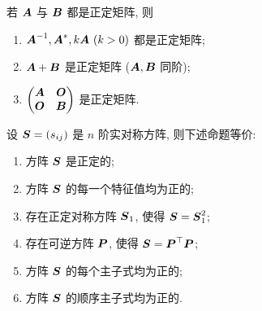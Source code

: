 
\begin{theorem}
    若 $\vb*{A}$ 与 $\vb*{B}$ 都是正定矩阵, 则 
    \begin{enumerate}[label=(\arabic{*})]
        \item $\vb*{A}^{-1}, \vb*{A}^*,k\vb*{A}~(k>0)$ 都是正定矩阵;
        \item $\vb*{A}+\vb*{B}$ 是正定矩阵 ($\vb*{A},\vb*{B}$ 同阶);
        \item $\mqty(\vb*{A}& \vb*{O}\\ \vb*{O} & \vb*{B})$ 是正定矩阵.
    \end{enumerate}
\end{theorem}

\begin{theorem}[实对称方阵的等价命题]
    设 $\vb*{S}=(s_{ij})$ 是 $n$ 阶实对称方阵, 则下述命题等价:
    \begin{enumerate}[label=(\arabic{*})]
        \item 方阵 $\vb*{S}$ 是正定的;
        \item 方阵 $\vb*{S}$ 的每一个特征值均为正的;
        \item 存在正定对称方阵 $\vb*{S}_1$, 使得 $\vb*{S}=\vb*{S}_1^2$;
        \item 存在可逆方阵 $\vb*{P}$, 使得 $\vb*{S}=\vb*{P}^\top\vb*{P}$;
        \item 方阵 $\vb*{S}$ 的每个主子式均为正的;
        \item 方阵 $\vb*{S}$ 的顺序主子式均为正的.
    \end{enumerate}
\end{theorem}


